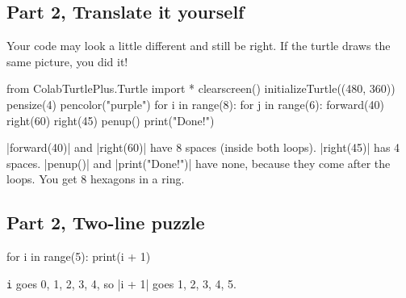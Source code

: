 \subsection*{Part 2, Translate it yourself}
Your code may look a little different and still be right. If the turtle draws the same picture, you did it!
\begin{codenonum}
from ColabTurtlePlus.Turtle import *
clearscreen()
initializeTurtle((480, 360))
pensize(4)
pencolor("purple")
for i in range(8):
    for j in range(6):
        forward(40)
        right(60)
    right(45)
penup()
print("Done!")
\end{codenonum}
\py|forward(40)| and \py|right(60)| have 8 spaces (inside both loops). \py|right(45)| has 4 spaces. \py|penup()| and \py|print("Done!")| have none, because they come after the loops. You get 8 hexagons in a ring.

\subsection*{Part 2, Two-line puzzle}
\begin{codenonum}
for i in range(5):
    print(i + 1)
\end{codenonum}
\texttt{i} goes 0, 1, 2, 3, 4, so \py|i + 1| goes 1, 2, 3, 4, 5.

